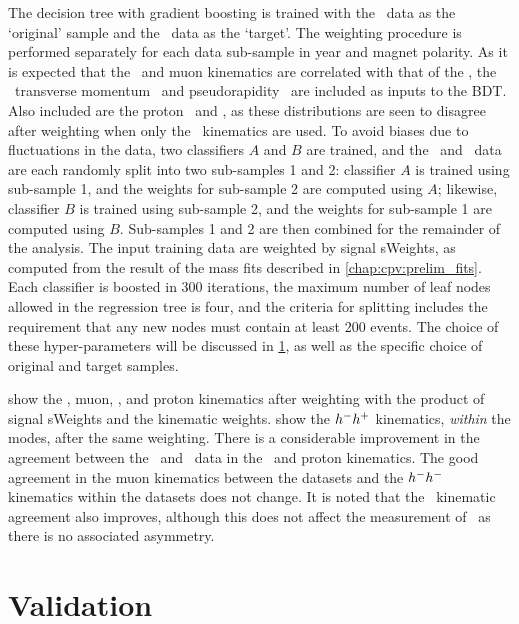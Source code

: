 The decision tree with gradient boosting is trained with the \ppipi\ data as
the `original' sample and the \pKK\ data as the `target'.
The weighting procedure is performed separately for each data sub-sample in
year and magnet polarity.
As it is expected that the \PLambdab\ and muon kinematics are correlated with
that of the \PLambdac, the \PLambdac\ transverse momentum \pT\ and
pseudorapidity \Eta\ are included as inputs to the \ac{BDT}.
Also included are the proton \pT\ and \Eta, as these distributions are seen to
disagree after weighting when only the \PLambdac\ kinematics are used.
To avoid biases due to fluctuations in the data, two classifiers $A$ and $B$
are trained, and the \pKK\ and \ppipi\ data are each randomly split into two
sub-samples 1 and 2: classifier $A$ is trained using sub-sample 1, and the
weights for sub-sample 2 are computed using $A$; likewise, classifier $B$ is
trained using sub-sample 2, and the weights for sub-sample 1 are computed using
$B$.
Sub-samples 1 and 2 are then combined for the remainder of the analysis.
The input training data are weighted by signal sWeights, as computed from the
result of the mass fits described in \cref{chap:cpv:prelim_fits}.
Each classifier is boosted in 300 iterations, the maximum number of leaf nodes
allowed in the regression tree is four, and the criteria for splitting includes
the requirement that any new nodes must contain at least 200 events.
The choice of these hyper-parameters will be discussed in
\cref{chap:cpv:kinematic_weighting:validation}, as well as the specific choice
of original and target samples.

show the \PLambdab, muon, \PLambdac, and proton kinematics after weighting with
the product of signal sWeights and the kinematic weights.
show the $h^{-}h^{+}$ kinematics, \emph{within} the modes, after the same
weighting.
There is a considerable improvement in the agreement between the \pKK\ and
\ppipi\ data in the \PLambdab\ and proton kinematics.
The good agreement in the muon kinematics between the datasets and the
$h^{-}h^{-}$ kinematics within the datasets does not change.
It is noted that the \PLambdac\ kinematic agreement also improves, although
this does not affect the measurement of \dACP\ as there is no associated
asymmetry.

\section{Validation}
\label{chap:cpv:kinematic_weighting:validation}

